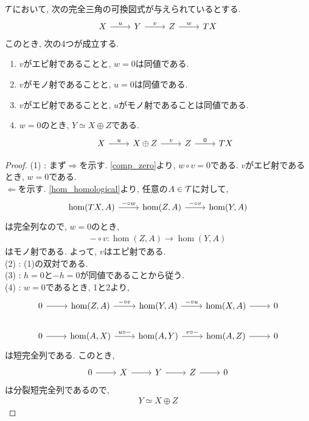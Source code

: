 \documentclass[uplatex, a4paper, 14Q, dvipdfmx]{jsarticle}
\begin{document}
\begin{corollary} \label{auto_split}
  $\mathcal{T}$において, 次の完全三角の可換図式が与えられているとする. 
  \[\begin{tikzcd}
    X & Y & Z & TX
    \arrow["u", from=1-1, to=1-2]
    \arrow["v", from=1-2, to=1-3]
    \arrow["w", from=1-3, to=1-4]
  \end{tikzcd}\] 
  このとき, 次の4つが成立する. 
  \begin{enumerate}
    \item $v$がエピ射であることと, $w=0$は同値である. 
    \item $v$がモノ射であることと, $u=0$は同値である. 
    \item $v$がエピ射であることと, $u$がモノ射であることは同値である. 
    \item $w=0$のとき, $Y \simeq X \oplus Z$である. 
    \[\begin{tikzcd}
      X & {X \oplus Z} & Z & TX
      \arrow["u", from=1-1, to=1-2]
      \arrow["v", from=1-2, to=1-3]
      \arrow["0", from=1-3, to=1-4]
    \end{tikzcd}\] 
  \end{enumerate}
\end{corollary}

\begin{proof}
  (1) : まず$\Rightarrow$を示す. 
  \cref{comp_zero}より, $w \circ v = 0$である. 
  $v$がエピ射であるとき, $w = 0$である. \\
  $\Leftarrow$を示す. 
  \cref{hom_homological}より, 任意の$A \in \mathcal{T}$に対して, 
  \[\begin{tikzcd}
    {\hom(TX,A)} & {\hom(Z,A)} & {\hom(Y,A)} 
    \arrow["{- \circ w}", from=1-1, to=1-2]
    \arrow["{- \circ v}", from=1-2, to=1-3]
  \end{tikzcd}\]
  は完全列なので, $w=0$のとき, 
  \begin{align*}
    - \circ v: \hom(Z,A) \to \hom(Y,A)
  \end{align*}
  はモノ射である. 
  よって, $v$はエピ射である. \\
  (2) : (1)の双対である. \\
  (3) : $h=0$と$-h=0$が同値であることから従う. \\
  (4) : $w=0$であるとき, 1と2より,
  \[\begin{tikzcd}
    0 & {\hom(Z,A)} & {\hom(Y,A)} & {\hom(X,A)} & 0 \\
    0 & {\hom(A,X)} & {\hom(A,Y)} & {\hom(A,Z)} & 0
    \arrow[from=1-1, to=1-2]
    \arrow["{- \circ v}", from=1-2, to=1-3]
    \arrow["{- \circ u}", from=1-3, to=1-4]
    \arrow[from=1-4, to=1-5]
    \arrow[from=2-1, to=2-2]
    \arrow["{v \circ -}", from=2-3, to=2-4]
    \arrow[from=2-4, to=2-5]
    \arrow["{u \circ -}", from=2-2, to=2-3]
  \end{tikzcd}\]
  は短完全列である. 
  このとき,
  \[\begin{tikzcd}
    0 & X & Y & Z & 0
    \arrow[from=1-1, to=1-2]
    \arrow[from=1-2, to=1-3]
    \arrow[from=1-3, to=1-4]
    \arrow[from=1-4, to=1-5]
  \end{tikzcd}\]
  は分裂短完全列であるので, 
  \begin{align*}
    Y \simeq X \oplus Z
  \end{align*}
\end{proof}
\end{document}
